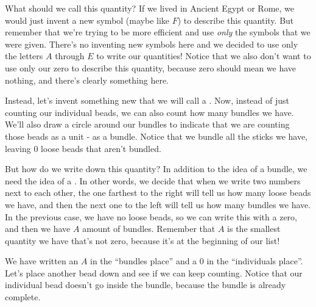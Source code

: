 \documentclass{ximera}
\begin{document}
What should we call this quantity? If we lived in Ancient Egypt or Rome, we would just invent a new symbol (maybe like $F$) to describe this quantity. But remember that we're trying to be more efficient and use {\em only} the symbols that we were given. There's no inventing new symbols here and we decided to use only the letters $A$ through $E$ to write our quantities! Notice that we also don't want to use only our zero to describe this quantity, because zero should mean we have nothing, and there's clearly something here.

Instead, let's invent something new that we will call a . Now, instead of just counting our individual beads, we can also count how many bundles we have. We'll also draw a circle around our bundles to indicate that we are counting those beads as a unit - as a bundle. Notice that we bundle all the sticks we have, leaving $0$ loose beads that aren't bundled.

\begin{center}
\end{center}

But how do we write down this quantity? In addition to the idea of a bundle, we need the idea of a . In other words, we decide that when we write two numbers next to each other, the one farthest to the right will tell us how many loose beads we have, and then the next one to the left will tell us how many bundles we have. In the previous case, we have no loose beads, so we can write this with a zero, and then we have $A$ amount of bundles. Remember that $A$ is the smallest quantity we have that's not zero, because it's at the beginning of our list!

\begin{center}
\end{center}

We have written an $A$ in the ``bundles place'' and a $0$ in the ``individuals place''. Let's place another bead down and see if we can keep counting. Notice that our individual bead doesn't go inside the bundle, because the bundle is already complete.
\end{document}
